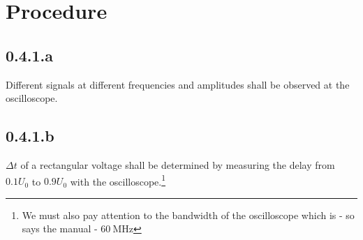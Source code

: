 \section{Procedure}
\subsection{0.4.1.a}
Different signals at different frequencies and amplitudes shall be observed at the oscilloscope.
\subsection{0.4.1.b}
$\Delta t$ of a rectangular voltage shall be determined by measuring the delay from $0.1U_0$ to $0.9U_0$ with the oscilloscope.\footnote{We must also pay attention to the bandwidth of the oscilloscope which is - so says the manual - $\SI{60}{\mega\hertz}$}